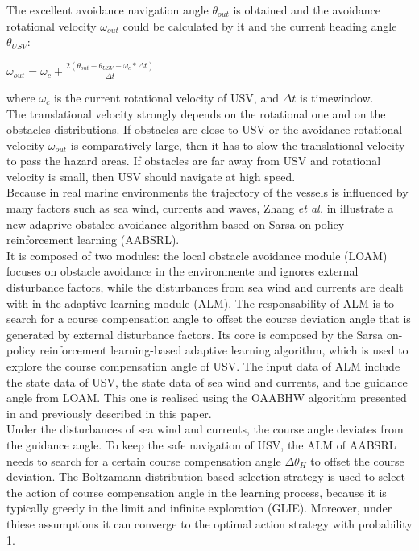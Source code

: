 \documentclass[journal]{IEEEtran}
\begin{document}
              The excellent avoidance navigation angle $\theta_{out}$ is obtained and the avoidance rotational velocity $\omega_{out}$ could be calculated by it and the current heading angle $\theta_{USV}$:
                  \begin{center}
                        $\omega_{out} = \omega_c + \frac{2(\theta_{out} - \theta_{USV} -\omega_c * \Delta t)}{\Delta t}$
                  \end{center}
              where $\omega_c$ is the current rotational velocity of USV, and $\Delta t$ is time\-window.\\
              The translational velocity strongly depends on the rotational one and on the obstacles distributions. If obstacles are close to USV or the avoidance rotational velocity $\omega_{out}$ is comparatively large, then it has to slow the translational velocity to pass the hazard areas. If obstacles are far away from USV and rotational velocity is small, then USV should navigate at high speed.\\

              \indent Because in real marine environments the trajectory of the vessels is influenced by many factors such as sea wind, currents and waves, Zhang \textit{et al.} in \cite{Zhang2014} illustrate a new adaprive obstalce avoidance algorithm based on Sarsa on-policy reinforcement learning (AABSRL).\\
              It is composed of two modules: the local obstacle avoidance module (LOAM) focuses on obstacle avoidance in the environmente and ignores external disturbance factors, while the disturbances from sea wind and currents are dealt with in the adaptive learning module (ALM). The responsability of ALM is to search for a course compensation angle to offset the course deviation angle that is generated by external disturbance factors. Its core is composed by the Sarsa on-policy reinforcement learning-based adaptive learning algorithm, which is used to explore the course compensation angle of USV. The input data of ALM include the state data of USV, the state data of sea wind and currents, and the guidance angle from LOAM. This one is realised using the OAABHW algorithm presented in \cite{Tang2012} and previously described in this paper.\\
              Under the disturbances of sea wind and currents, the course angle deviates from the guidance angle. To keep the safe navigation of USV, the ALM of AABSRL needs to search for a certain course compensation angle $\Delta \theta_H $ to offset the course deviation. The Boltzamann distribution-based selection strategy is used to select the action of course compensation angle in the learning process, because it is typically greedy in the limit and infinite exploration (GLIE). Moreover, under thiese assumptions it can converge to the optimal action strategy with probability 1.
\end{document}
